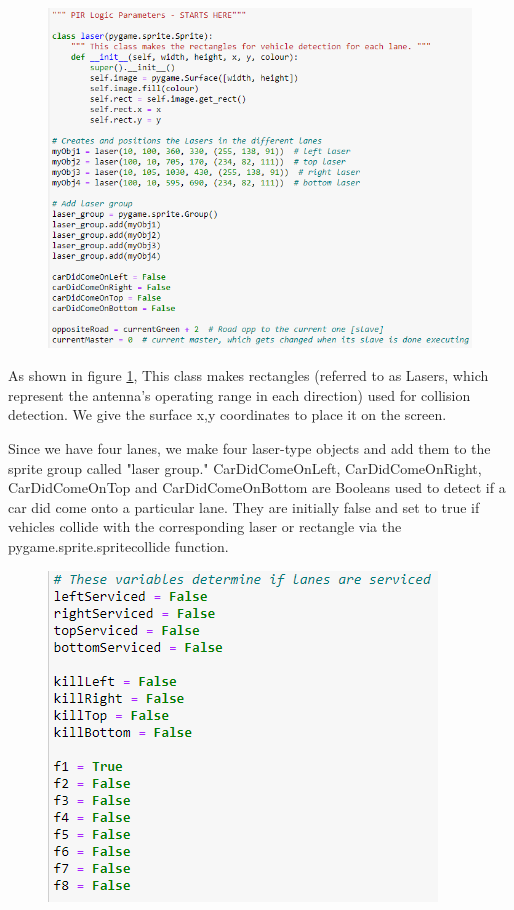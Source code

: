 \documentclass[12pt, a4paper,titlepage]{article}
\begin{document}
\begin{figure}[H]
	\centering
	\includegraphics[width=\linewidth]{images/p1}
	\caption{}
	\label{fig:p1}
\end{figure}

As shown in figure \ref{fig:p1}, This class makes rectangles (referred to as Lasers, which represent the antenna's operating range in each direction) used for collision detection. We give the surface x,y coordinates to place it on the screen. 

Since we have four lanes, we make four laser-type objects and add them to the sprite group called "laser group." CarDidComeOnLeft, CarDidComeOnRight, CarDidComeOnTop and CarDidComeOnBottom are Booleans used to detect if a car did come onto a particular lane. They are initially false and set to true if vehicles collide with the corresponding laser or rectangle via the pygame.sprite.spritecollide function.

\begin{figure}[H]
	\centering
	\includegraphics[width=\linewidth]{images/p2}
	\caption{}
	\label{fig:p2}
\end{figure}
\end{document}
